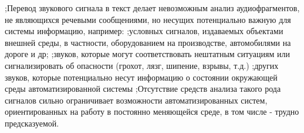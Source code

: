 \begin{SCn}
{
;Перевод звукового сигнала в текст делает невозможным анализ аудиофрагментов, не являющихся речевыми сообщениями, но несущих потенциально
важную для системы информацию, например:
;условных сигналов, издаваемых объектами внешней среды, в частности, оборудованием на производстве, автомобилями на дороге и др;
;звуков, которые могут соответствовать нештатным ситуациям или сигнализировать об опасности (грохот, лязг, шипение, взрывы, т.д.)
;других звуков, которые потенциально несут информацию о состоянии окружающей среды автоматизированной системы
;Отсутствие средств анализа такого рода сигналов сильно ограничивает возможности автоматизированных систем, ориентированных на работу в постоянно меняющейся среде, в том числе - трудно предсказуемой.
}
\filemodefalse


\scnendstruct

\end{SCn}
    